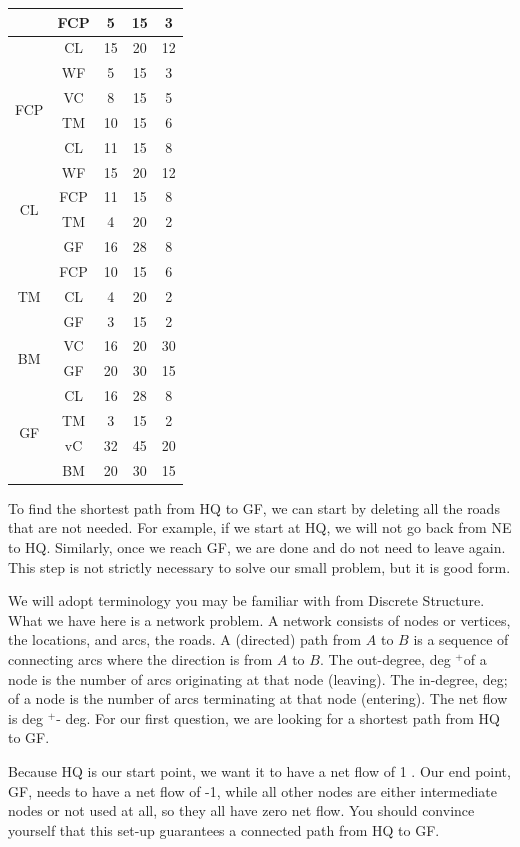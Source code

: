 \begin{center}
\begin{tabular}{|c|c|c|c|c|}
\hline
 & FCP & 5 & 15 & 3 \\
\hline
 & CL & 15 & 20 & 12 \\
\hline
\multirow[t]{4}{*}{FCP} & WF & 5 & 15 & 3 \\
\hline
 & VC & 8 & 15 & 5 \\
\hline
 & TM & 10 & 15 & 6 \\
\hline
 & CL & 11 & 15 & 8 \\
\hline
\multirow[t]{4}{*}{CL} & WF & 15 & 20 & 12 \\
\hline
 & FCP & 11 & 15 & 8 \\
\hline
 & TM & 4 & 20 & 2 \\
\hline
 & GF & 16 & 28 & 8 \\
\hline
\multirow[t]{3}{*}{TM} & FCP & 10 & 15 & 6 \\
\hline
 & CL & 4 & 20 & 2 \\
\hline
 & GF & 3 & 15 & 2 \\
\hline
\multirow[t]{2}{*}{BM} & VC & 16 & 20 & 30 \\
\hline
 & GF & 20 & 30 & 15 \\
\hline
\multirow[t]{4}{*}{GF} & CL & 16 & 28 & 8 \\
\hline
 & TM & 3 & 15 & 2 \\
\hline
 & vC & 32 & 45 & 20 \\
\hline
 & BM & 20 & 30 & 15 \\
\hline
\end{tabular}
\end{center}

To find the shortest path from HQ to GF, we can start by deleting all the roads that are not needed. For example, if we start at HQ, we will not go back from NE to HQ. Similarly, once we reach GF, we are done and do not need to leave again. This step is not strictly necessary to solve our small problem, but it is good form.

We will adopt terminology you may be familiar with from Discrete Structure. What we have here is a network problem. A network consists of nodes or vertices, the locations, and arcs, the roads. A (directed) path from $A$ to $B$ is a sequence of connecting arcs where the direction is from $A$ to $B$. The out-degree, deg $^{+}$of a node is the number of arcs originating at that node (leaving). The in-degree, deg; of a node is the number of arcs terminating at that node (entering). The net flow is deg $^{+}$- deg. For our first question, we are looking for a shortest path from HQ to GF.

Because HQ is our start point, we want it to have a net flow of 1 . Our end point, GF, needs to have a net flow of -1, while all other nodes are either intermediate nodes or not used at all, so they all have zero net flow. You should convince yourself that this set-up guarantees a connected path from HQ to GF.

